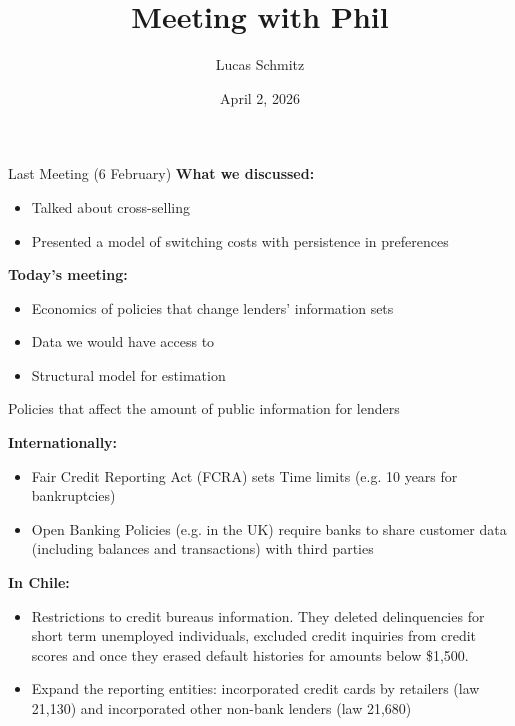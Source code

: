 \documentclass[10pt,aspectratio=169]{beamer}
\title{Meeting with Phil}
\author{Lucas Schmitz\inst{1}}
\institute{\inst{1} Yale University}
\date{April 2, 2026}
\begin{document}
\begin{frame}{Last Meeting (6 February)}
\textbf{What we discussed:}
\begin{itemize}
    \item Talked about cross-selling  
    \item Presented a model of switching costs with persistence in preferences
\end{itemize}

\vspace{0.3cm}
\textbf{Today's meeting:}
\begin{itemize}
    \item Economics of policies that change lenders' information sets
    \item Data we would have access to
    \item Structural model for estimation
\end{itemize}
\end{frame}

\begin{frame}{Policies that affect the amount of public information for lenders}


\textbf{Internationally:}
\begin{itemize}
    \item Fair Credit Reporting Act (FCRA) sets  Time limits (e.g. 10 years for bankruptcies)
    \item Open Banking Policies (e.g. in the UK) require banks to share customer data (including balances and transactions) with third parties  
\end{itemize}

\textbf{In Chile:}
\begin{itemize}
    \item Restrictions to credit bureaus information. They deleted delinquencies for short term unemployed individuals, excluded credit inquiries from credit scores and once they erased default histories for amounts below \$1,500. 
    \item Expand the reporting entities: incorporated credit cards by retailers (law 21,130) and incorporated other non-bank lenders (law 21,680)
\end{itemize}
\end{frame}
\end{document}
